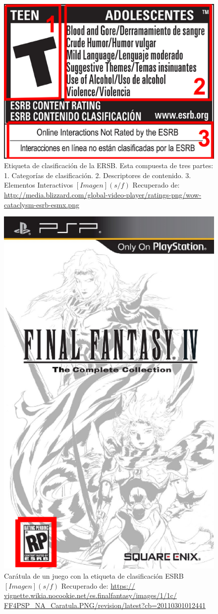 		\begin{figure}
					\centering
					\includegraphics[width=0.4 \textwidth]{03MarcoTeoricoA/imagenes/etiqueta.eps}
					\caption{Etiqueta de clasificación de la ERSB. Esta compuesta de 
					tres partes: 1. Categorías de clasificación. 2. Descriptores de 
					contenido. 3. Elementos Interactivos $ [Imagen] (s/f)$ Recuperado 
					de: \url{http://media.blizzard.com/global-video-player/ratings-png/wow-cataclysm-esrb-esmx.png} } 
					\label{fig_etiquetaERSB}
		\end{figure}
		\begin{figure}
					\centering
					\includegraphics[width=0.3 \textwidth]{03MarcoTeoricoA/imagenes/FFCaratula.eps}
					\caption{Carátula de un juego con la etiqueta de clasificación ESRB 
					$[Imagen] (s/f)$ Recuperado de: \url{https://
					vignette.wikia.nocookie.net/es.finalfantasy/images/1/1c/
					FF4PSP\_NA\_Caratula.PNG/revision/latest?cb=20110301012441} } 
					\label{fig_caratulaERSB}
		\end{figure}
